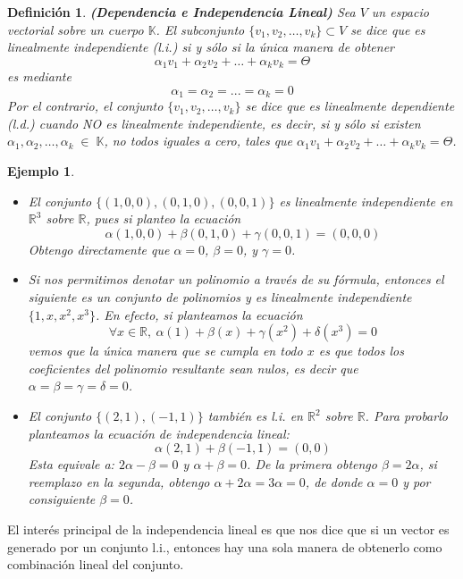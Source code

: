\documentclass[12pt]{book}
\newtheorem{defi}{Definici\'on}
\newtheorem{ejem}{Ejemplo}
\def\R{\mathbb{R}}
\def\K{\mathbb{K}}
\begin{document}
\begin{defi}
\textbf{\emph{(Dependencia e Independencia Lineal)}} Sea $V$ un espacio vectorial sobre un cuerpo $\K$. El subconjunto $\{v_1,v_2,\dots,v_k\}\subset V$ se dice que es {\em linealmente independiente (l.i.)} si y s\'olo si la única manera de obtener 
$$\alpha_1v_1+\alpha_2v_2+\dots+\alpha_kv_k=\Theta$$
es mediante 
$$\alpha_1=\alpha_2=...=\alpha_k=0$$
Por el contrario, el conjunto $\{v_1,v_2,\dots,v_k\}$ se dice que es {\em linealmente dependiente (l.d.)} cuando NO es linealmente independiente, es decir, si y s\'olo si existen $\alpha_1,\alpha_2,\dots,\alpha_k\;\in\;\K$, no todos iguales a cero, tales que $\alpha_1v_1+\alpha_2v_2+\dots+\alpha_kv_k=\Theta$.
\end{defi}



\begin{ejem}
{\em
\begin{itemize}
\item El conjunto $\{(1,0,0),(0,1,0),(0,0,1)\}$ es linealmente independiente en $\R^3 $ sobre $\R$, pues si planteo la ecuación
$$\alpha (1,0,0)+\beta(0,1,0)+\gamma(0,0,1)=(0,0,0)$$
Obtengo directamente que $\alpha=0$, $\beta=0$, y $\gamma=0$.
\item Si nos permitimos denotar un polinomio a través de su fórmula, entonces el siguiente es un conjunto de polinomios y es linealmente independiente $\{1,x,x^2,x^3\}$.
En efecto, si planteamos la ecuación
$$\forall x\in\R,\ \alpha(1)+\beta(x)+\gamma(x^2)+\delta(x^3)=0$$
vemos que la única manera que se cumpla en todo $x$ es que todos los coeficientes del polinomio resultante sean nulos, es decir que $\alpha=\beta=\gamma=\delta=0$.
\item El conjunto $\{(2,1),(-1,1)\}$ también es l.i. en $\R^2$ sobre $\R$.
Para probarlo planteamos la ecuación de independencia lineal:
$$\alpha(2,1)+\beta(-1,1)=(0,0)$$
Esta equivale a: $2\alpha-\beta=0$ y $\alpha+\beta=0$. 
De la primera obtengo $\beta=2\alpha$, si reemplazo en la segunda, obtengo $\alpha+2\alpha=3\alpha=0$, de donde $\alpha=0$ y por consiguiente $\beta=0$.
\end{itemize}
}
\end{ejem}

El interés principal de la independencia lineal es que nos dice que si un vector es generado por un conjunto l.i., entonces hay una sola manera de obtenerlo como combinación lineal del conjunto.
\end{document}
